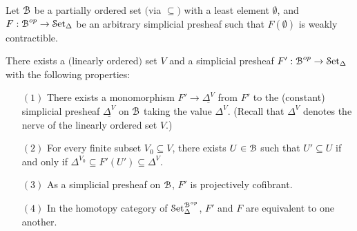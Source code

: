 \begin{lemma}\label{grumppp}
Let $\operatorname{\mathcal{B}}$ be a partially ordered set $($via $\subseteq${}$)$ with a least element $\emptyset$, and $F: \operatorname{\mathcal{B}}^{op} \rightarrow \operatorname{\mathcal{S}et_{\Delta}}$ be an arbitrary simplicial presheaf such that $F(\emptyset)$ is weakly contractible.

There
exists a $($linearly ordered$)$ set $V$ and a simplicial presheaf $F': \operatorname{\mathcal{B}}^{op} \rightarrow \operatorname{\mathcal{S}et_{\Delta}}$ with the following properties:
\begin{itemize}
\item[$(1)$] There exists a monomorphism $F' \rightarrow \underline{\Delta^{V}}$ from $F'$ to the (constant)
simplicial presheaf $\underline{\Delta^{V}}$ on $\operatorname{\mathcal{B}}$ taking the value $\Delta^V$. (Recall that
$\Delta^V$ denotes the nerve of the linearly ordered set $V$.)

\item[$(2)$] For every finite subset $V_0 \subseteq V$, there exists $U \in \operatorname{\mathcal{B}}$ such that 
$U' \subseteq U$ if and only if $\Delta^{V_0} \subseteq F'(U') \subseteq \Delta^{V}$.

\item[$(3)$] As a simplicial presheaf on $\operatorname{\mathcal{B}}$, $F'$ is projectively cofibrant.

\item[$(4)$] In the homotopy category of $\operatorname{\mathcal{S}et}_{\Delta}^{\operatorname{\mathcal{B}}^{op}}$, $F'$ and $F$ are equivalent to one another.

\end{itemize}

\end{lemma}

